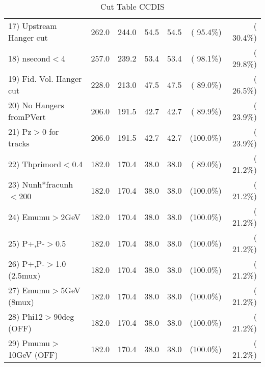 \begin{table}[h!]
\begin{tabular}{||l||r|r|r|r|r|r||}
 17) Upstream Hanger cut  &        262.0 &        244.0 &         54.5 &         54.5 & ( 95.4\%) & ( 30.4\%) \\
 18) nsecond$<$4          &        257.0 &        239.2 &         53.4 &         53.4 & ( 98.1\%) & ( 29.8\%) \\
 19) Fid. Vol. Hanger cut &        228.0 &        213.0 &         47.5 &         47.5 & ( 89.0\%) & ( 26.5\%) \\
 20) No Hangers fromPVert &        206.0 &        191.5 &         42.7 &         42.7 & ( 89.9\%) & ( 23.9\%) \\
 21) Pz$>$0 for tracks    &        206.0 &        191.5 &         42.7 &         42.7 & (100.0\%) & ( 23.9\%) \\
 22) Thprimord$<$0.4      &        182.0 &        170.4 &         38.0 &         38.0 & ( 89.0\%) & ( 21.2\%) \\
 23) Nunh*fracunh$<$200   &        182.0 &        170.4 &         38.0 &         38.0 & (100.0\%) & ( 21.2\%) \\
 24) Emumu$>$2GeV         &        182.0 &        170.4 &         38.0 &         38.0 & (100.0\%) & ( 21.2\%) \\
 25) P+,P-$>$0.5          &        182.0 &        170.4 &         38.0 &         38.0 & (100.0\%) & ( 21.2\%) \\
 26) P+,P-$>$1.0 (2.5mux) &        182.0 &        170.4 &         38.0 &         38.0 & (100.0\%) & ( 21.2\%) \\
 27) Emumu$>$5GeV  (8mux) &        182.0 &        170.4 &         38.0 &         38.0 & (100.0\%) & ( 21.2\%) \\
 28) Phi12$>$90deg  (OFF) &        182.0 &        170.4 &         38.0 &         38.0 & (100.0\%) & ( 21.2\%) \\
 29) Pmumu$>$10GeV  (OFF) &        182.0 &        170.4 &         38.0 &         38.0 & (100.0\%) & ( 21.2\%) \\
 \hline
 \hline
 \end{tabular}
 \caption{Cut Table  CCDIS    }
 \label{tab-cutcohjpsi-mumu_ncdis}
 \end{table}
